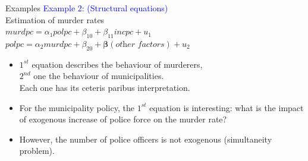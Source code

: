 \documentclass[usenames,dvipsnames]{beamer}
\begin{document}
\begin{frame}{Examples}
\textcolor{Blue}{Example 2: (Structural equations)} \\Estimation of murder rates\\
\medskip
\qquad $\textit{murdpc} = \alpha_1 \textit{polpc} + \beta_{10} + \beta_{11} \textit{incpc} + u_1$ \\
\qquad \hspace{0.25cm} $\textit{polpc} = \alpha_2 \textit{murdpc} + \beta_{20} +\bm{\beta} (\textit{other factors}) + u_2$ \\
\medskip
\begin{itemize}
\item $1^{st}$ equation describes the behaviour of murderers, \\$2^{nd}$ one the behaviour of municipalities. \\Each one has its ceteris paribus interpretation.\\
\medskip
\item For the municipality policy, the $1^{st}$ equation is interesting: what is the impact of exogenous increase of police force on the murder rate? 
\item However, the number of police officers  is not exogenous (simultaneity problem). 
\end{itemize}
\end{frame}
\end{document}
